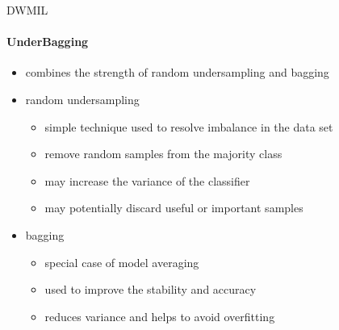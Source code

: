 
\begin{frame}{DWMIL}
\framesubtitle{UnderBagging}

\begin{itemize}
    \item combines the strength of random undersampling and bagging
    \item random undersampling
    \begin{itemize}
        \item simple technique used to resolve imbalance in the data set
        \item remove random samples from the majority class
        \item may increase the variance of the classifier
        \item may potentially discard useful or important samples
    \end{itemize}
    \item bagging
    \begin{itemize}
        \item special case of model averaging
        \item used to improve the stability and accuracy
        \item reduces variance and helps to avoid overfitting
    \end{itemize}
\end{itemize}

\end{frame}

